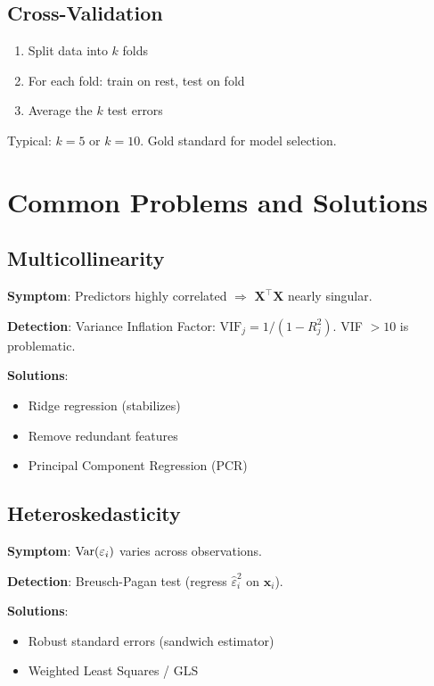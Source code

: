 \documentclass[main.tex]{subfiles}
\begin{document}
\subsection{Cross-Validation}

\begin{enumerate}
    \item Split data into $k$ folds
    \item For each fold: train on rest, test on fold
    \item Average the $k$ test errors
\end{enumerate}

Typical: $k = 5$ or $k = 10$. Gold standard for model selection.

\section{Common Problems and Solutions}

\subsection{Multicollinearity}

\textbf{Symptom}: Predictors highly correlated $\Rightarrow$ $\mathbf{X}^\top\mathbf{X}$ nearly singular.

\textbf{Detection}: Variance Inflation Factor: $\text{VIF}_j = 1/(1 - R_j^2)$. VIF $> 10$ is problematic.

\textbf{Solutions}:
\begin{itemize}
    \item Ridge regression (stabilizes)
    \item Remove redundant features
    \item Principal Component Regression (PCR)
\end{itemize}

\subsection{Heteroskedasticity}

\textbf{Symptom}: $\text{Var}(\varepsilon_i)$ varies across observations.

\textbf{Detection}: Breusch-Pagan test (regress $\hat{\varepsilon}_i^2$ on $\mathbf{x}_i$).

\textbf{Solutions}:
\begin{itemize}
    \item Robust standard errors (sandwich estimator)
    \item Weighted Least Squares / GLS
\end{itemize}
\end{document}
